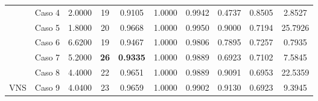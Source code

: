 \begin{table}[]
{\begin{tabular}{cccccccccc}
			\multicolumn{1}{c|}{}                      & {\color[HTML]{003532} Caso 4} & {\color[HTML]{003532} 2.0000}                                        & {\color[HTML]{003532} 19}                                          & {\color[HTML]{003532} 0.9105}                           & {\color[HTML]{003532} 1.0000} & {\color[HTML]{003532} 0.9942} & {\color[HTML]{003532} 0.4737} & {\color[HTML]{003532} 0.8505} & {\color[HTML]{003532} 2.8527}                                        \\
			\multicolumn{1}{c|}{}                      & Caso 5                        & 1.8000                                                               & 20                                                                 & 0.9668                                                  & 1.0000                        & 0.9950                        & 0.9000                        & 0.7194                        & 25.7926                                                              \\
			\multicolumn{1}{c|}{}                      & {\color[HTML]{003532} Caso 6} & {\color[HTML]{003532} 6.6200}                                        & {\color[HTML]{003532} 19}                                          & {\color[HTML]{003532} 0.9467}                           & {\color[HTML]{003532} 1.0000} & {\color[HTML]{003532} 0.9806} & {\color[HTML]{003532} 0.7895} & {\color[HTML]{003532} 0.7257} & {\color[HTML]{003532} 0.7935}                                        \\
			\multicolumn{1}{c|}{}                      & Caso 7                        & 5.2000                                                               & {\color[HTML]{9A0000} \textbf{26}}                                 & {\color[HTML]{9A0000} \textbf{0.9335}}                  & 1.0000                        & 0.9889                        & 0.6923                        & 0.7102                        & 7.5845                                                               \\
			\multicolumn{1}{c|}{}                      & {\color[HTML]{003532} Caso 8} & {\color[HTML]{003532} 4.4000}                                        & {\color[HTML]{003532} 22}                                          & {\color[HTML]{003532} 0.9651}                           & {\color[HTML]{003532} 1.0000} & {\color[HTML]{003532} 0.9889} & {\color[HTML]{003532} 0.9091} & {\color[HTML]{003532} 0.6953} & {\color[HTML]{003532} 22.5359}                                       \\
			\multicolumn{1}{c|}{\multirow{-8}{*}{VNS}} & Caso 9                        & 4.0400                                                               & 23                                                                 & 0.9659                                                  & 1.0000                        & 0.9902                        & 0.9130                        & 0.6923                        & 9.3945                                                               \\

\end{tabular}}
\end{table}
